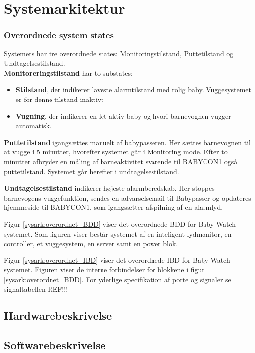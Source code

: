 \chapter{Systemarkitektur}



\subsection{Overordnede system states}


Systemets har tre overordnede states: Monitoringstilstand, Puttetilstand og Undtagelsestilstand. \\\textbf{Monitoreringstilstand} har to substates: 
\begin{itemize}
	\item \textbf{Stilstand}, der indikerer laveste alarmtilstand med rolig baby. Vuggesystemet er for denne tilstand inaktivt
	\item \textbf{Vugning}, der indikerer en let aktiv baby og hvori barnevognen vugger automatisk.
\end{itemize}

\textbf{Puttetilstand} igangsættes manuelt af babypasseren. Her sættes barnevognen til at vugge i 5 minutter, hvorefter systemet går i Monitoring mode. Efter to minutter afbryder en måling af barneaktivitet svarende til BABYCON1 også puttetilstand. Systemet går herefter i undtagelsestilstand.

\textbf{Undtagelsestilstand} indikerer højeste alarmberedskab. Her stoppes barnevogens vuggefunktion, sendes en advarselsemail til Babypasser og opdateres hjemmeside til BABYCON1, som igangsætter afspilning af en alarmlyd. 

Figur \ref{sysark:overordnet_BDD} viser det overordnede BDD for Baby Watch systemet. Som figuren viser består systemet af en inteligent lydmonitor, en controller, et vuggesystem, en server samt en power blok. 


Figur \ref{sysark:overordnet_IBD} viser det overordnede IBD for Baby Watch systemet.  Figuren viser de interne forbindelser for blokkene i figur \ref{sysark:overordnet_BDD}. For yderlige specifikation af porte og signaler se signaltabellen REF!!!



\newpage
\section{Hardwarebeskrivelse}


\clearpage
\section{Softwarebeskrivelse}



